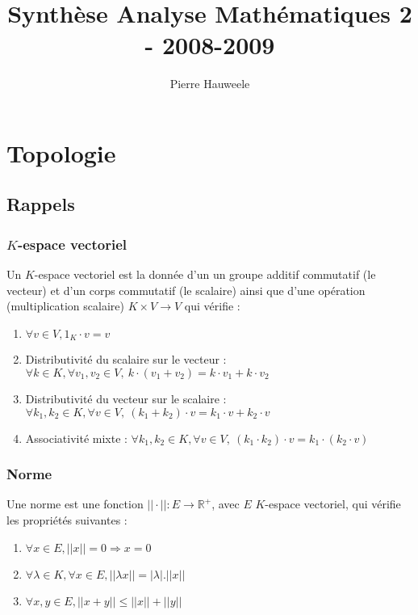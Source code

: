 \documentclass[a4paper,10pt]{article}
\author{Pierre Hauweele}
\title{Synth\`ese Analyse Math\'ematiques 2 - 2008-2009}
\date{}
\newcommand{\ap}{ \to} %
\newcommand{\so}{\Rightarrow} %
\newcommand{\IR}{\mathbb{R}} %
\begin{document}
\maketitle
\tableofcontents
\newpage
\section{Topologie}
 \subsection{Rappels}
  \subsubsection{$K$-espace vectoriel}
   Un $K$-espace vectoriel est la donn\'ee d'un un groupe additif commutatif (le vecteur) et d'un corps commutatif (le scalaire) ainsi que d'une op\'eration (multiplication scalaire) $K \times V \ap V$ qui v\'erifie :\\
   \begin{enumerate}
     \item $\forall v \in V, 1_K \cdot v = v$
     \item Distributivit\'e du scalaire sur le vecteur :
       $\forall k \in K, \forall v_1, v_2 \in V,~ k \cdot (v_1+v_2) = k \cdot v_1+k \cdot v_2$
     \item Distributivit\'e du vecteur sur le scalaire :
       $\forall k_1, k_2 \in K, \forall v \in V,~ (k_1+k_2) \cdot v = k_1\cdot v + k_2 \cdot v$
     \item Associativit\'e mixte :
       $\forall k_1,k_2 \in K, \forall v \in V,~ (k_1 \cdot k_2) \cdot v = k_1 \cdot (k_2 \cdot v)$
   \end{enumerate}

  \subsubsection{Norme}
   Une norme est une fonction $||\cdot|| : E \ap \IR^+$, avec $E$ $K$-espace vectoriel, qui v\'erifie les propri\'et\'es suivantes :
   \begin{enumerate}
     \item $\forall x \in E, ||x||=0 \so x=0$
     \item $\forall \lambda \in K, \forall x \in E, ||\lambda x ||=|\lambda|.||x||$
     \item $\forall x,y \in E, ||x+y|| \le ||x|| + ||y||$
   \end{enumerate}
\end{document}
